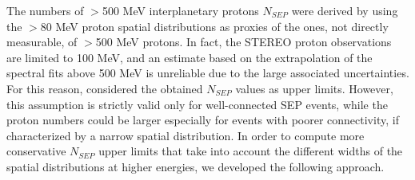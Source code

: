 \documentclass{aastex61}
\begin{document}
The numbers of $>$500 MeV interplanetary protons $N_{SEP}$ were derived by \citet{ref:DENOLFO2019} using the $>80$ MeV proton spatial distributions 
as proxies of the ones, not directly measurable, of $>$500 MeV protons. In fact, the STEREO proton observations are limited to 100 MeV, and an estimate based on the extrapolation of the spectral fits above 500 MeV is unreliable due to the large associated uncertainties. For this reason, \citet{ref:DENOLFO2019} considered the obtained $N_{SEP}$ values as upper limits. However, this assumption is strictly valid only for well-connected SEP events, while the proton numbers could be larger especially for events with poorer connectivity, if characterized by a narrow spatial distribution. 
In order to compute more conservative $N_{SEP}$ upper limits that take into account the different widths of the spatial distributions at higher energies, we developed the following approach.
\end{document}
